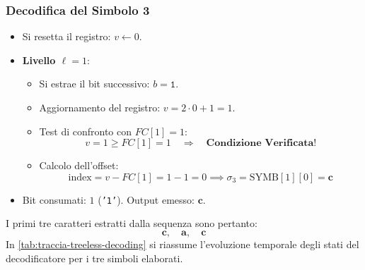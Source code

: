 \subsubsection*{Decodifica del Simbolo 3}
\begin{itemize}
  \item Si resetta il registro: $v \leftarrow 0$.
  \item \textbf{Livello $\ell = 1$}:
  \begin{itemize}
    \item Si estrae il bit successivo: $b = \texttt{1}$.
    \item Aggiornamento del registro: $v = 2 \cdot 0 + 1 = 1$.
    \item Test di confronto con $FC[1] = 1$:
    \begin{equation}
      v = 1 \ge FC[1] = 1 \quad \Longrightarrow \quad \textbf{Condizione Verificata!}
    \end{equation}
    \item Calcolo dell'offset:
    \begin{equation}
      \text{index} = v - FC[1] = 1 - 1 = 0 \implies \sigma_3 = \text{SYMB}[1][0] = \mathbf{c}
    \end{equation}
  \end{itemize}
  \item Bit consumati: $1$ (\texttt{'1'}). Output emesso: $\mathbf{c}$.
\end{itemize}

I primi tre caratteri estratti dalla sequenza sono pertanto:
\begin{equation}
  \mathbf{c}, \quad \mathbf{a}, \quad \mathbf{c}
\end{equation}
In \autoref{tab:traccia-treeless-decoding} si riassume l'evoluzione temporale degli stati del decodificatore per i tre simboli elaborati.

\begin{table}[H]
\centering
\caption{Traccia tabellare dell'algoritmo di decodifica senza albero per i primi tre simboli del flusso $\mathcal{B}$.}
\label{tab:traccia-treeless-decoding}
\vspace{2mm}
\end{table}

